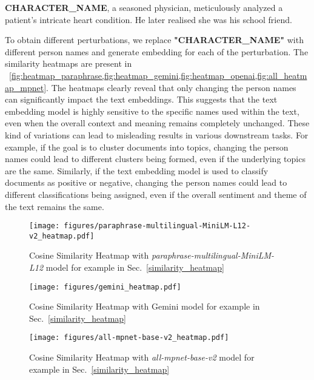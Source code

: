 {\color{blue} \textbf{CHARACTER\_NAME}, a seasoned physician, meticulously analyzed a patient’s intricate heart condition. He later realised she was his school friend.}

To obtain different perturbations, we replace  \textbf{{\color{blue} "CHARACTER\_NAME"}} with different person names and generate embedding for each of the perturbation. The similarity heatmaps are present in  ~\cref{fig:heatmap_paraphrase,fig:heatmap_gemini,fig:heatmap_openai,fig:all_heatmap_mpnet}. The heatmaps clearly reveal that only changing the person names can significantly impact the text embeddings. This suggests that the text embedding model is highly sensitive to the specific names used within the text, even when the overall context and meaning remains completely unchanged. These kind of variations can lead to misleading results in various downstream tasks. For example, if the goal is to cluster documents into topics, changing the person names could lead to different clusters being formed, even if the underlying topics are the same. Similarly, if the text embedding model is used to classify documents as positive or negative, changing the person names could lead to different classifications being assigned, even if the overall sentiment and theme of the text remains the same. 


\begin{figure*}[h!]
  \centering
  \texttt{[image: figures/paraphrase-multilingual-MiniLM-L12-v2\_heatmap.pdf]}
  \caption{Cosine Similarity Heatmap with \textit{paraphrase-multilingual-MiniLM-L12} model for example in Sec.~\ref{similarity_heatmap}}
  \label{fig:heatmap_paraphrase}
\end{figure*}

\begin{figure*}[h!]
  \centering
  \texttt{[image: figures/gemini\_heatmap.pdf]}
  \caption{Cosine Similarity Heatmap with Gemini model for example in Sec.~\ref{similarity_heatmap}}
  \label{fig:heatmap_gemini}
\end{figure*}

\begin{figure*}[h!]
  \centering
  \texttt{[image: figures/all-mpnet-base-v2\_heatmap.pdf]}
  \caption{Cosine Similarity Heatmap with \textit{all-mpnet-base-v2} model for example in Sec.~\ref{similarity_heatmap}  \label{fig:all_heatmap_mpnet}}
\end{figure*}

